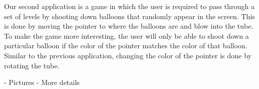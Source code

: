 Our second application is a game in which the user is required to pass through a set of levels by shooting down balloons that randomly appear in the screen. This is done by moving the pointer to where the balloons are and blow into the tube. To make the game more interesting, the user will only be able to shoot down a particular balloon if the color of the pointer matches the color of that balloon. Similar to the previous application, changing the color of the pointer is done by rotating the tube.

\TODO
- Pictures \newline
- More details
